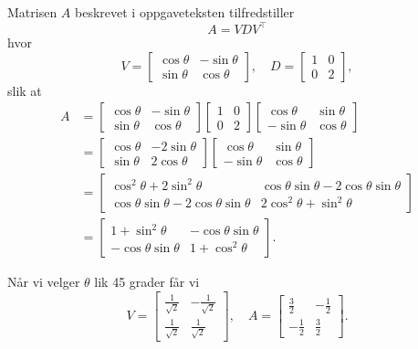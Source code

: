 \documentclass[titlepage,a4paper,12pt,norsk]{IMFeksamen}
\newcommand{\tr}{^\top}
\newcommand{\0}{\V{0}}
\begin{document}
\begin{oppgave}
Matrisen $A$ beskrevet i oppgaveteksten tilfredstiller \[
A=VDV\tr
\]
hvor \[
V=\begin{bmatrix}
\cos \theta  & -\sin \theta  \\  \sin \theta & \cos \theta 
\end{bmatrix}, \quad
D=
\begin{bmatrix}
1 & 0 \\
0 & 2
\end{bmatrix},
\]
slik at 
\begin{align*}
A&=
\begin{bmatrix}
\cos \theta  & -\sin \theta  \\  \sin \theta & \cos \theta 
\end{bmatrix}
\begin{bmatrix}
1 & 0 \\
0 & 2
\end{bmatrix}
\begin{bmatrix}
\cos \theta  & \sin \theta  \\  -\sin \theta & \cos \theta 
\end{bmatrix}\\
&=
\begin{bmatrix}
\cos \theta  & -2\sin \theta  \\  \sin \theta & 2\cos \theta 
\end{bmatrix}
\begin{bmatrix}
\cos \theta  & \sin \theta  \\  -\sin \theta & \cos \theta 
\end{bmatrix}\\
&=
\begin{bmatrix}
\cos^2 \theta +2\sin^2 \theta   & \cos\theta \sin \theta  -2\cos\theta \sin \theta \\  
\cos\theta \sin \theta  -2\cos\theta \sin \theta& 2\cos^2 \theta +\sin^2\theta
\end{bmatrix}\\
&=
\begin{bmatrix}
1+\sin^2 \theta   & -\cos\theta \sin \theta \\  
-\cos\theta \sin \theta& 1+\cos^2 \theta
\end{bmatrix}.
\end{align*}

Når vi velger $\theta$ lik 45 grader får vi 
\[
V=
\begin{bmatrix}
\frac{1}{\sqrt{2}}  & -\frac{1}{\sqrt{2}}  \\ \frac{1}{\sqrt{2}} & \frac{1}{\sqrt{2}}
\end{bmatrix}, \quad
A= \begin{bmatrix}
\frac{3}{2}   & -\frac{1}{2}\\  
-\frac{1}{2}& \frac{3}{2}
\end{bmatrix}.
\]



\end{oppgave}
\end{document}
